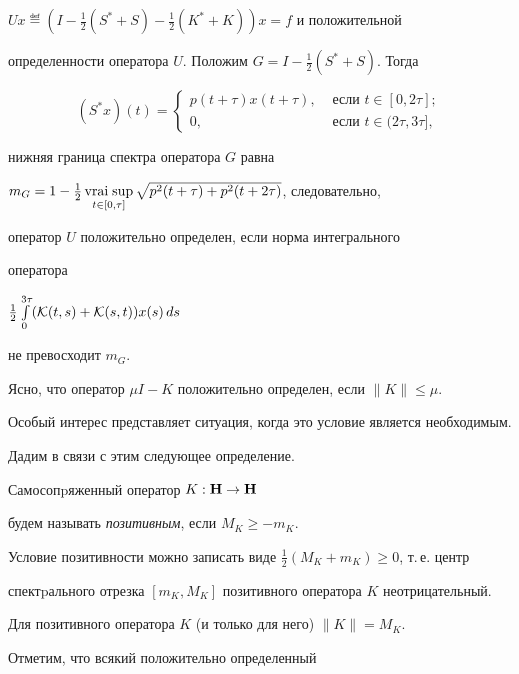 \begin{exam}
$Ux\eqdef(I-\frac12(S^*+S)-\frac12(K^*+K))x=f$ и положительной


определенности оператора $U$. Положим $G=I-\frac12(S^*+S)$. Тогда


$$


(S^*x)(t)=


\begin{cases}


p(t+\tau)x(t+\tau), &\text{ если }t\in[0,2\tau];\\


0, & \text{ если }t\in(2\tau,3\tau],


\end{cases}


$$


нижняя граница спектра оператора $G$ равна


$m_G=1-\frac12\vraisup\limits_{t\in[0,\tau]}


\sqrt{p^2(t+\tau)+p^2(t+2\tau)}$, следовательно, 


оператор $U$ положительно определен, если норма интегрального


оператора


$\frac12\int\limits_0^{3\tau}({\cal K}(t,s)+{\cal K}(s,t))x(s)\,ds$


не превосходит $m_G$.


\end{exam}





Ясно, что оператор $\mu I-K$ положительно определен, если $\|K\|\le\mu$.


Особый интерес представляет ситуация, когда это условие является необходимым.


Дадим в связи с этим следующее определение.





Самосопpяженный оператор $K:{\bold H}\to{\bold H}$


будем называть {\it позитивным}, если $M_K\ge-m_K$.


Условие позитивности можно записать виде $\frac12(M_K+m_K)\ge0$, т.\,е. центр


спектpального отрезка $[m_K,M_K]$ позитивного оператора $K$ неотрицательный.


Для позитивного оператора $K$ (и только для него) $\|K\|=M_K$.





Отметим, что всякий положительно определенный 


